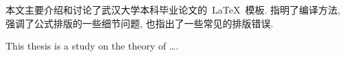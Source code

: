 \begin{cnabstract}
    本文主要介绍和讨论了武汉大学本科毕业论文的~\LaTeX~模板.
    指明了编译方法, 强调了公式排版的一些细节问题, 也指出了一些常见的排版错误.
\end{cnabstract}



\begin{enabstract}
This thesis is a study on the theory of \dots.

\end{enabstract}

